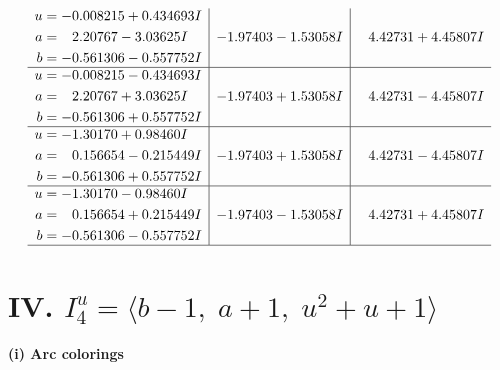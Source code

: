 \documentclass[1p]{elsarticle_modified}
\theoremstyle{definition}
\begin{document}
$$\begin{array}{c|c|c}
\begin{aligned}
u &= -0.008215 + 0.434693 I \\
a &= \phantom{-}2.20767 - 3.03625 I \\
b &= -0.561306 - 0.557752 I\end{aligned}
 & -1.97403 - 1.53058 I & \phantom{-}4.42731 + 4.45807 I \\ \hline\begin{aligned}
u &= -0.008215 - 0.434693 I \\
a &= \phantom{-}2.20767 + 3.03625 I \\
b &= -0.561306 + 0.557752 I\end{aligned}
 & -1.97403 + 1.53058 I & \phantom{-}4.42731 - 4.45807 I \\ \hline\begin{aligned}
u &= -1.30170 + 0.98460 I \\
a &= \phantom{-}0.156654 - 0.215449 I \\
b &= -0.561306 + 0.557752 I\end{aligned}
 & -1.97403 + 1.53058 I & \phantom{-}4.42731 - 4.45807 I \\ \hline\begin{aligned}
u &= -1.30170 - 0.98460 I \\
a &= \phantom{-}0.156654 + 0.215449 I \\
b &= -0.561306 - 0.557752 I\end{aligned}
 & -1.97403 - 1.53058 I & \phantom{-}4.42731 + 4.45807 I\\
 \hline 
 \end{array}$$\newpage\newpage\renewcommand{\arraystretch}{1}
\centering \section*{IV. $I^u_{4}= \langle b-1,\;a+1,\;u^2+u+1 \rangle$}
\flushleft \textbf{(i) Arc colorings}\\
\end{document}
